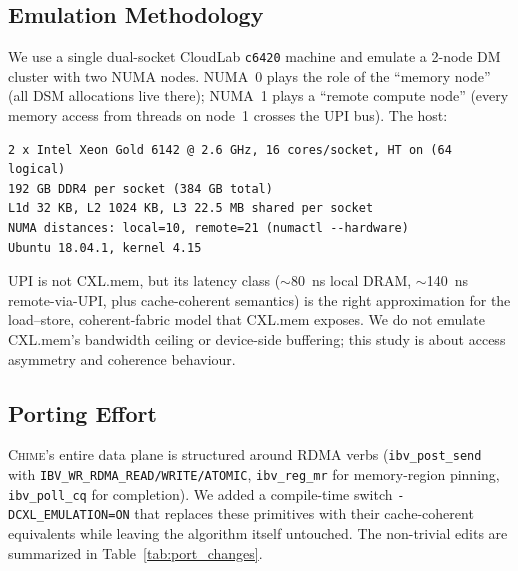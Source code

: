 \documentclass[11pt]{article}
\begin{document}
\subsection{Emulation Methodology}
We use a single dual-socket CloudLab \texttt{c6420} machine and emulate a 2-node DM cluster with two NUMA nodes. NUMA~0 plays the role of the ``memory node'' (all DSM allocations live there); NUMA~1 plays a ``remote compute node'' (every memory access from threads on node~1 crosses the UPI bus). The host:
\begin{lstlisting}
2 x Intel Xeon Gold 6142 @ 2.6 GHz, 16 cores/socket, HT on (64 logical)
192 GB DDR4 per socket (384 GB total)
L1d 32 KB, L2 1024 KB, L3 22.5 MB shared per socket
NUMA distances: local=10, remote=21 (numactl --hardware)
Ubuntu 18.04.1, kernel 4.15
\end{lstlisting}
UPI is not CXL.mem, but its latency class (\(\sim\)80~ns local DRAM, \(\sim\)140~ns remote-via-UPI, plus cache-coherent semantics) is the right approximation for the load--store, coherent-fabric model that CXL.mem exposes. We do not emulate CXL.mem's bandwidth ceiling or device-side buffering; this study is about access asymmetry and coherence behaviour.

\subsection{Porting Effort}
\textsc{Chime}'s entire data plane is structured around RDMA verbs (\texttt{ibv\_post\_send} with \texttt{IBV\_WR\_RDMA\_READ/WRITE/ATOMIC}, \texttt{ibv\_reg\_mr} for memory-region pinning, \texttt{ibv\_poll\_cq} for completion). We added a compile-time switch \texttt{-DCXL\_EMULATION=ON} that replaces these primitives with their cache-coherent equivalents while leaving the algorithm itself untouched. The non-trivial edits are summarized in Table~\ref{tab:port_changes}.
\end{document}
